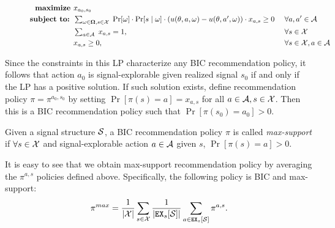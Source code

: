 \begin{figure}[H]
\begin{mdframed}
\vspace{-5mm}
\begin{alignat*}{2}
\textbf{maximize }   & x_{a_0,s_0}\  \\
\textbf{subject to: }
    & \textstyle \sum_{\omega \in \varOmega, s \in \X} \;
    \Pr[\omega] \cdot \Pr[s \mid  \omega] \cdot
        \left(u(\theta, a, \omega) - u(\theta, a', \omega)\right) \cdot x_{a,s} \geq 0   &\ & \forall a,a' \in \A \\
    & \textstyle \sum_{a\in \A}\; x_{a,s} = 1,  \ &\ & \forall s \in \X \\
    & x_{a,s} \geq 0,  \ &\ & \forall s \in \X, a\in \A
\end{alignat*}
\end{mdframed}
\label{fig:public_lp}
\end{figure}

Since the constraints in this LP characterize any BIC recommendation policy, it follows that action $a_0$ is signal-explorable given realized signal $s_0$ if and only if the LP has a positive solution. If such solution exists, define recommendation policy $\pi = \pi^{a_0,s_0}$ by setting
    $\Pr[\pi(s) = a] = x_{a,s}$ for all $a\in \A, s\in \X$.
Then this is a BIC recommendation policy such that
    $\Pr[\pi(s_0) = a_0] > 0$.

\begin{definition}
Given a signal structure $\S$, a BIC recommendation policy $\pi$ is called  \emph{max-support} if $\forall s \in \X$  and signal-explorable action $a\in \A$ given $s$, $\Pr[\pi(s) = a] > 0$.
\end{definition}


It is easy to see that we obtain max-support recommendation policy by averaging the $\pi^{a,s}$ policies defined above. Specifically, the following policy is BIC and max-support:
\begin{align}\label{eq:pimax}
\pi^{max} = \frac{1}{|\X|} \sum_{s \in \X} \frac{1}{|\EX_s[\S]|} \sum_{a \in \EX_s[\S]} \pi^{a,s}.
\end{align}

%

